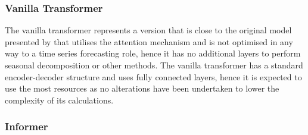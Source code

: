 \documentclass{article}
\begin{document}
\subsubsection{Vanilla Transformer}

The vanilla transformer represents a version that is close to the original model presented by \cite{vanilla-transformer} that utilises the attention mechanism and is not optimised in any way to a time series forecasting role, hence it has no additional layers to perform seasonal decomposition or other methods.
The vanilla transformer has a standard encoder-decoder structure and uses fully connected layers, hence it is expected to use the most resources as no alterations have been undertaken to lower the complexity of its calculations. 

\subsubsection{Informer}
\end{document}
